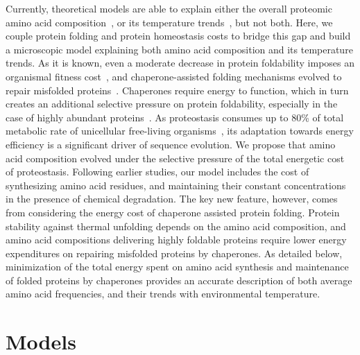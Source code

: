 \documentclass[10pt,letterpaper]{article}
\begin{document}
Currently, theoretical models are able to explain either the overall proteomic amino acid composition~\cite{Seligmann2003CostMinimization,Heizer2011Amino,Krick2014Amino}, or its temperature trends~\cite{Berezovsky2007Positive,Venev2015Massively}, but not both. Here, we couple protein folding and protein homeostasis costs to bridge this gap  and build a microscopic model explaining both amino acid composition and its temperature trends.   
As it is known, even a moderate decrease in protein foldability imposes an organismal fitness cost~\cite{Drummond2008MistranslationInduced,Samerotte2011Misfolded}, and chaperone-assisted folding mechanisms evolved to repair misfolded proteins~\cite{Hartl2011Molecular}. Chaperones require energy to function, which in turn creates an additional selective pressure on protein foldability, especially in the case of highly abundant proteins~\cite{Kepp2014Model}. As proteostasis consumes up to 80\% of total metabolic rate of  unicellular free-living organisms~\cite{Kepp2014Model}, its adaptation towards energy efficiency is a significant driver of sequence evolution.
We propose that amino acid composition evolved under the selective pressure of the total energetic cost of proteostasis. Following earlier studies, our model includes the cost of synthesizing amino acid residues, and maintaining their constant concentrations in the presence of chemical degradation. The key new feature, however, comes from considering the energy cost of chaperone assisted protein folding. Protein stability against thermal unfolding depends on the amino acid composition, and amino acid compositions delivering highly foldable proteins require lower energy expenditures on repairing misfolded proteins by chaperones. As detailed below, minimization of the total energy spent on amino acid synthesis and maintenance of folded proteins by chaperones provides an accurate description of both average amino acid frequencies, and their trends with environmental temperature.

\section*{Models}
\end{document}
